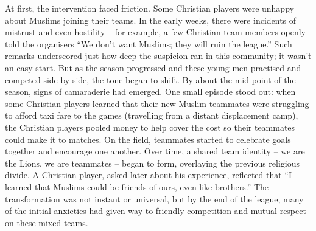 \documentclass[
  letterpaper,
]{book}
\begin{document}
At first, the intervention faced friction. Some Christian players were
unhappy about Muslims joining their teams. In the early weeks, there
were incidents of mistrust and even hostility -- for example, a few
Christian team members openly told the organisers ``We don't want
Muslims; they will ruin the league.'' Such remarks underscored just how
deep the suspicion ran in this community; it wasn't an easy start. But
as the season progressed and these young men practised and competed
side-by-side, the tone began to shift. By about the mid-point of the
season, signs of camaraderie had emerged. One small episode stood out:
when some Christian players learned that their new Muslim teammates were
struggling to afford taxi fare to the games (travelling from a distant
displacement camp), the Christian players pooled money to help cover the
cost so their teammates could make it to matches. On the field,
teammates started to celebrate goals together and encourage one another.
Over time, a shared team identity -- we are the Lions, we are teammates
-- began to form, overlaying the previous religious divide. A Christian
player, asked later about his experience, reflected that ``I learned
that Muslims could be friends of ours, even like brothers.'' The
transformation was not instant or universal, but by the end of the
league, many of the initial anxieties had given way to friendly
competition and mutual respect on these mixed teams.
\end{document}
